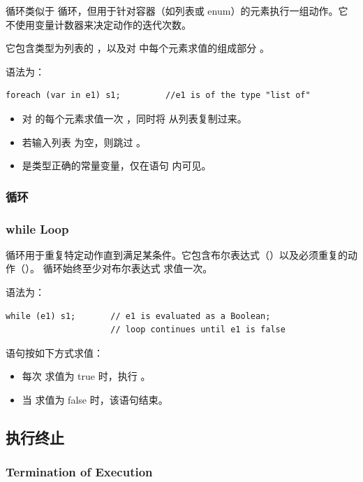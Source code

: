  循环类似于  循环，但用于针对容器（如列表或 enum）的元素执行一组动作。它不使用变量计数器来决定动作的迭代次数。

它包含类型为列表的 ，以及对  中每个元素求值的组成部分 。

语法为：
\begin{lstlisting}[style=pxl]
foreach (var in e1) s1;         //e1 is of the type "list of"
\end{lstlisting}

\begin{itemize}
  \item 对  的每个元素求值一次 ，同时将  从列表复制过来。
  \item 若输入列表  为空，则跳过 。
  \item {} 是类型正确的常量变量，仅在语句  内可见。
\end{itemize}

\subsubsection{ 循环}
\subsubsection*{while Loop}

 循环用于重复特定动作直到满足某条件。它包含布尔表达式（）以及必须重复的动作（）。 循环始终至少对布尔表达式  求值一次。

语法为：
\begin{lstlisting}[style=pxl]
while (e1) s1;       // e1 is evaluated as a Boolean;
                     // loop continues until e1 is false
\end{lstlisting}

 语句按如下方式求值：
\begin{itemize}
  \item 每次  求值为 true 时，执行 。
  \item 当  求值为 false 时，该语句结束。
\end{itemize}

\subsection{执行终止}
\subsubsection*{Termination of Execution}

